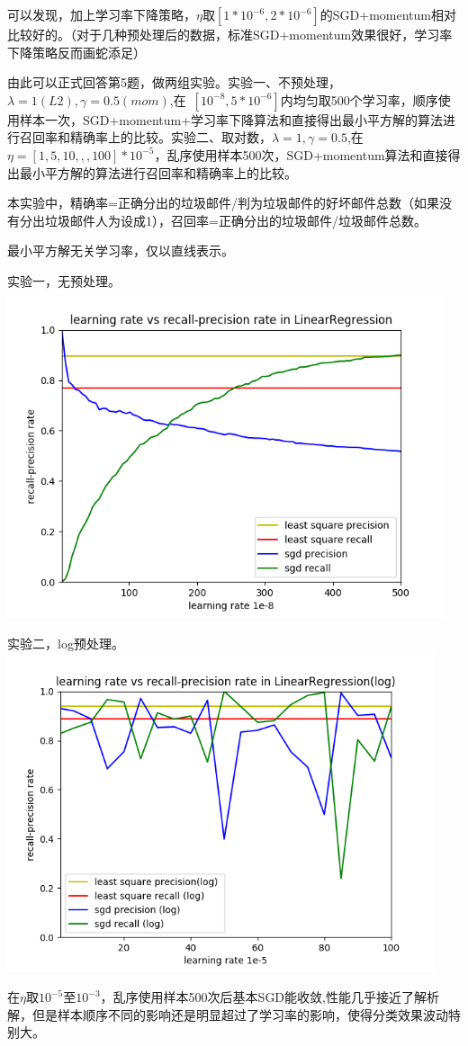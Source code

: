 \documentclass[hyperref,UTF8]{ctexart}
\begin{document}
\par 可以发现，加上学习率下降策略，$\eta$取$[1*10^{-6},2*10^{-6}]$的SGD+momentum相对比较好的。（对于几种预处理后的数据，标准SGD+momentum效果很好，学习率下降策略反而画蛇添足）
\par 由此可以正式回答第5题，做两组实验。实验一、不预处理，$\lambda = 1 (L2),\gamma = 0.5(mom)$,在\ $[10^{-8},5*10^{-6}]$内均匀取500个学习率，顺序使用样本一次，SGD+momentum+学习率下降算法和直接得出最小平方解的算法进行召回率和精确率上的比较。实验二、取对数，$\lambda = 1,\gamma = 0.5$,在$\eta = [1,5,10,,,100]*10^{-5}$，乱序使用样本500次，SGD+momentum算法和直接得出最小平方解的算法进行召回率和精确率上的比较。
\par 本实验中，精确率=正确分出的垃圾邮件/判为垃圾邮件的好坏邮件总数（如果没有分出垃圾邮件人为设成1），召回率=正确分出的垃圾邮件/垃圾邮件总数。
\par 最小平方解无关学习率，仅以直线表示。
\par 实验一，无预处理。\\
\includegraphics[height=3.8in]{rec-pre.png}
\par 实验二，log预处理。\\
\includegraphics[height=3.7in]{rec-pre3.png}
\par 在$\eta$取$10^{-5}$至$10^{-3}$，乱序使用样本500次后基本SGD能收敛,性能几乎接近了解析解，但是样本顺序不同的影响还是明显超过了学习率的影响，使得分类效果波动特别大。
\end{document}
